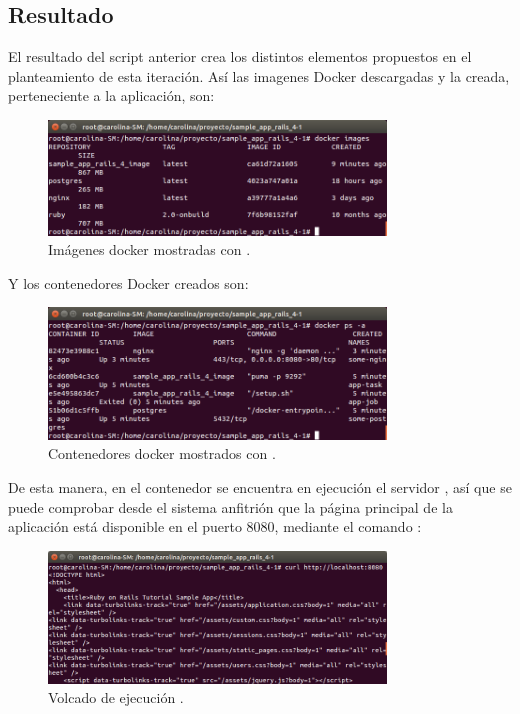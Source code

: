 \subsection{Resultado}

El resultado del script anterior crea los distintos elementos propuestos en el planteamiento de esta iteración. Así las imagenes Docker descargadas y la creada, perteneciente a la aplicación, son:

\begin{figure}[H]
\centering
\includegraphics[width=0.8\textwidth]{images/figures/dockerimages.png}
\caption{Imágenes docker mostradas con .}
\end{figure}

Y los contenedores Docker creados son:

\begin{figure}[H]
\centering
\includegraphics[width=0.8\textwidth]{images/figures/dockerps.png}
\caption{Contenedores docker mostrados con .}
\end{figure}

De esta manera, en el contenedor  se encuentra en ejecución el servidor , así que se puede comprobar desde el sistema anfitrión que la página principal de la aplicación  está disponible en el puerto 8080, mediante el comando :

\begin{figure}[H]
\centering
\includegraphics[width=0.8\textwidth]{images/figures/curldocker.png}
\caption{Volcado de ejecución .}
\end{figure}

